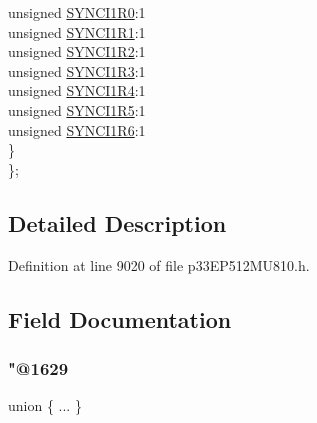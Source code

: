 \begin{DoxyCompactItemize}
\begin{tabbing}
\>\>unsigned \hyperlink{structtag_r_p_i_n_r37_b_i_t_s_a21641b22da4f9e563082f2fa452fddb2}{SYNCI1R0}:1\\
\>\>unsigned \hyperlink{structtag_r_p_i_n_r37_b_i_t_s_a4da723a9239dcb6ab920a52aedf4c63c}{SYNCI1R1}:1\\
\>\>unsigned \hyperlink{structtag_r_p_i_n_r37_b_i_t_s_a83105aadf246fff93bb27bdc5946d15e}{SYNCI1R2}:1\\
\>\>unsigned \hyperlink{structtag_r_p_i_n_r37_b_i_t_s_ad9932b0bacd9e751c50b1562ce428116}{SYNCI1R3}:1\\
\>\>unsigned \hyperlink{structtag_r_p_i_n_r37_b_i_t_s_a49cd6c70c54d6bf48dba45d049f012c7}{SYNCI1R4}:1\\
\>\>unsigned \hyperlink{structtag_r_p_i_n_r37_b_i_t_s_a1325ae6232e8df2e735501b2547569b7}{SYNCI1R5}:1\\
\>\>unsigned \hyperlink{structtag_r_p_i_n_r37_b_i_t_s_ab83e378629931b0ab0754f6b943d1aa1}{SYNCI1R6}:1\\
\>\} \\
\}; \\

\end{tabbing}\end{DoxyCompactItemize}


\subsection{Detailed Description}


Definition at line 9020 of file p33\+E\+P512\+M\+U810.\+h.



\subsection{Field Documentation}
\mbox{\label{structtag_r_p_i_n_r37_b_i_t_s_a3f612d48e880abae579abf39d6c50cf1}} 
\subsubsection{\texorpdfstring{"@1629}{@1629}}
{\footnotesize\ttfamily union \{ ... \} }

\mbox{\label{structtag_r_p_i_n_r37_b_i_t_s_adf71f3d8410c1f1dbbc96680a92c49af}} 
